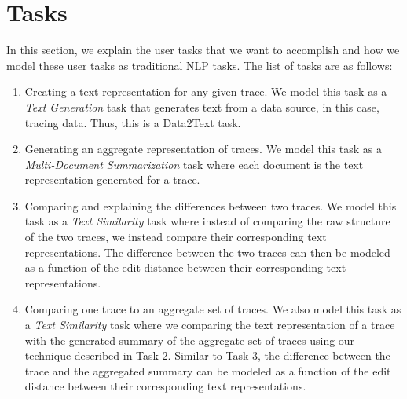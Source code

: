\section{Tasks}
\label{sec:tasks}

In this section, we explain the user tasks that we want to accomplish and how we model
these user tasks as traditional NLP tasks. The list of tasks are as follows:

\begin{enumerate}
    \item Creating a text representation for any given trace. We model this task as a \emph{Text Generation} task
        that generates text from a data source, in this case, tracing data. Thus, this is a Data2Text task.
    \item Generating an aggregate representation of traces. We model this task as a \emph{Multi-Document Summarization} task
        where each document is the text representation generated for a trace.
    \item Comparing and explaining the differences between two traces. We model this task as a \emph{Text Similarity} task
        where instead of comparing the raw structure of the two traces, we instead compare their corresponding text representations. The
        difference between the two traces can then be modeled as a function of the edit distance between their corresponding text representations.
    \item Comparing one trace to an aggregate set of traces. We also model this task as a \emph{Text Similarity} task
        where we comparing the text representation of a trace with the generated summary of the aggregate set of traces using our technique described
        in Task 2. Similar to Task 3, the difference between the trace and the aggregated summary can be modeled as a function of the edit distance
        between their corresponding text representations.
\end{enumerate}